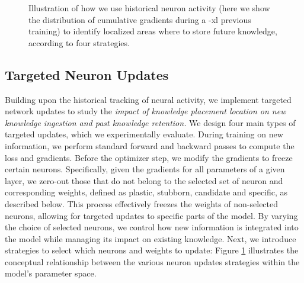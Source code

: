 \begin{figure}[!t]
    \centering
    \caption{Illustration of how we use historical neuron activity (here we show the distribution of cumulative gradients during a \gpttwo-xl previous training) to identify localized areas where to store future knowledge, according to four strategies.}
    \label{fig:gradient_distribution}
\end{figure}

\subsection{Targeted Neuron Updates}\label{sec:targeted}
Building upon the historical tracking of neural activity, we implement targeted network updates to 
study the \textit{impact of knowledge placement location on new knowledge ingestion and past knowledge retention.}
We design four main types of targeted updates, which we experimentally evaluate. 
During training on new information, we perform standard forward and backward passes to compute the loss and gradients. Before the optimizer step, we modify the gradients to freeze certain neurons. Specifically, given the gradients for all parameters of a given layer, we zero-out those that do not belong to the selected set of neuron and corresponding weights, defined as plastic, stubborn, candidate and specific, as described below. This process effectively freezes the weights of non-selected neurons, allowing for targeted updates to specific parts of the model. By varying the choice of selected neurons, we control how new information is integrated into the model while managing its impact on existing knowledge. Next, we introduce strategies to select which neurons and weights to update:  Figure \ref{fig:gradient_distribution} illustrates the conceptual relationship between the various neuron updates strategies within the model's parameter space.

